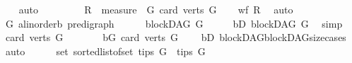 \begin{isabellebody}
%
\isadelimproof
\ \ %
\endisadelimproof
%
\isatagproof
{}\isamarkupfalse%
\ auto%
\endisatagproof
{\isafoldproof}%
%
\isadelimproof
\ \isanewline
%
\endisadelimproof
{}\isamarkupfalse%
%
\isadelimproof
\ %
\endisadelimproof
%
\isatagproof
{}\isamarkupfalse%
\ \isanewline
\ \ \isamarkupfalse%
\ {\isacharquery}{\kern0pt}R\ {\isacharequal}{\kern0pt}\ {\isachardoublequoteopen}measure\ {\isacharparenleft}{\kern0pt}\ {\isasymlambda}G{\isachardot}{\kern0pt}\ {\isacharparenleft}{\kern0pt}card\ {\isacharparenleft}{\kern0pt}verts\ G{\isacharparenright}{\kern0pt}{\isacharparenright}{\kern0pt}{\isacharparenright}{\kern0pt}{\isachardoublequoteclose}\isanewline
\ \ \isamarkupfalse%
\ {\isachardoublequoteopen}wf\ {\isacharquery}{\kern0pt}R{\isachardoublequoteclose}\ \isamarkupfalse%
\ auto\isanewline
{}\isamarkupfalse%
\isanewline
\ \ \isamarkupfalse%
\ G\ {\isacharcolon}{\kern0pt}{\isacharcolon}{\kern0pt}{\isachardoublequoteopen}{\isacharparenleft}{\kern0pt}{\isacharprime}{\kern0pt}a{\isacharcolon}{\kern0pt}{\isacharcolon}{\kern0pt}linorder{\isacharcomma}{\kern0pt}{\isacharprime}{\kern0pt}b{\isacharparenright}{\kern0pt}\ pre{\isacharunderscore}{\kern0pt}digraph{\isachardoublequoteclose}\isanewline
\ \ \isamarkupfalse%
\ {\isachardoublequoteopen}{\isasymnot}\ {\isasymnot}\ blockDAG\ G{\isachardoublequoteclose}\isanewline
\ \ \isamarkupfalse%
\ \isamarkupfalse%
\ bD{\isacharcolon}{\kern0pt}\ {\isachardoublequoteopen}blockDAG\ G{\isachardoublequoteclose}\ \isamarkupfalse%
\ simp\isanewline
\ \ \isamarkupfalse%
\ {\isachardoublequoteopen}card\ {\isacharparenleft}{\kern0pt}verts\ G{\isacharparenright}{\kern0pt}\ {\isasymnoteq}\ {}{\isachardoublequoteclose}\isanewline
\ \ \isamarkupfalse%
\ \isamarkupfalse%
\ bG{\isacharcolon}{\kern0pt}\ {\isachardoublequoteopen}card\ {\isacharparenleft}{\kern0pt}verts\ G{\isacharparenright}{\kern0pt}\ {\isachargreater}{\kern0pt}\ {}{\isachardoublequoteclose}\ \isamarkupfalse%
\ bD\ blockDAG{\isachardot}{\kern0pt}blockDAG{\isacharunderscore}{\kern0pt}size{\isacharunderscore}{\kern0pt}cases\ \isamarkupfalse%
\ auto\ \isanewline
\ \ \isamarkupfalse%
\ {\isachardoublequoteopen}\ set\ {\isacharparenleft}{\kern0pt}sorted{\isacharunderscore}{\kern0pt}list{\isacharunderscore}{\kern0pt}of{\isacharunderscore}{\kern0pt}set\ {\isacharparenleft}{\kern0pt}tips\ G{\isacharparenright}{\kern0pt}{\isacharparenright}{\kern0pt}\ {\isacharequal}{\kern0pt}\ tips\ G{\isachardoublequoteclose}\ \ \isanewline

\end{isabellebody}
